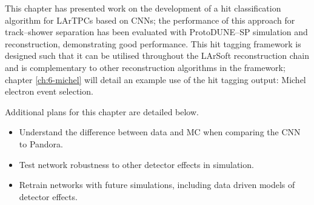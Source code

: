 This chapter has presented work on the development of a hit classification
algorithm for LArTPCs based on CNNs; the performance of this approach for
track--shower separation has been evaluated with ProtoDUNE--SP simulation and
reconstruction, demonstrating good performance. This hit tagging framework is
designed such that it can be utilised throughout the LArSoft reconstruction
chain and is complementary to other reconstruction algorithms in the framework;
chapter \ref{ch:6-michel} will detail an example use of the hit tagging output:
Michel electron event selection.

\noindent Additional plans for this chapter are detailed below.
\begin{itemize}[noitemsep,nolistsep]
	\item Understand the difference between data and MC when comparing the
	CNN to Pandora.
	\item Test network robustness to other detector effects in
	simulation. 
	\item Retrain networks with future simulations, including data
	driven models of detector effects.
\end{itemize}

